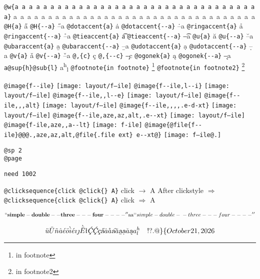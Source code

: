 \documentclass{book}
\renewcommand{\includegraphics}[1]{\fbox{FIG #1}}
\begin{document}
\begin{titlepage}
\texttt{@w\{a a a a a a a a a a a a a a a a a a a a a a a a a a a a a a a a a a a\}} \hbox{a a a a a a a a a a a a a a a a a a a a a a a a a a a a a a a a a a a}
\texttt{@H\{a\}} \H{a}
\texttt{@H\{{-}{-}a\}} \H{--a}
\texttt{@dotaccent\{a\}} \.{a}
\texttt{@dotaccent\{{-}{-}a\}} \.{--a}
\texttt{@ringaccent\{a\}} \r{a}
\texttt{@ringaccent\{{-}{-}a\}} \r{--a}
\texttt{@tieaccent\{a\}} \t{a}
\texttt{@tieaccent\{{-}{-}a\}} \t{--a}
\texttt{@u\{a\}} \u{a}
\texttt{@u\{{-}{-}a\}} \u{--a}
\texttt{@ubaraccent\{a\}} \b{a}
\texttt{@ubaraccent\{{-}{-}a\}} \b{--a}
\texttt{@udotaccent\{a\}} \d{a}
\texttt{@udotaccent\{{-}{-}a\}} \d{--a}
\texttt{@v\{a\}} \v{a}
\texttt{@v\{{-}{-}a\}} \v{--a}
\texttt{@,\{c\}} \c{c}
\texttt{@,\{{-}{-}c\}} \c{--c}
\texttt{@ogonek\{a\}} \k{a}
\texttt{@ogonek\{{-}{-}a\}} \k{--a}
\texttt{a@sup\{h\}@sub\{l\}} a\textsuperscript{h}\textsubscript{l}
\texttt{@footnote\{in footnote\}} \footnote{in footnote}
\texttt{@footnote\{in footnote2\}} \footnote{in footnote2}

\texttt{@image\{f{-}{-}ile\}} \texttt{[image: layout/f--ile]}
\texttt{@image\{f{-}{-}ile,l{-}{-}i\}} \texttt{[image: layout/f--ile]}
\texttt{@image\{f{-}{-}ile,,l{-}{-}e\}} \texttt{[image: layout/f--ile]}
\texttt{@image\{f{-}{-}ile,,,alt\}} \texttt{[image: layout/f--ile]}
\texttt{@image\{f{-}{-}ile,,,,.e-d-xt\}} \texttt{[image: layout/f--ile]}
\texttt{@image\{f{-}{-}ile,aze,az,alt,.e{-}{-}xt\}} \texttt{[image: layout/f--ile]}
\texttt{@image\{f-ile,aze,,a{-}{-}lt\}} \texttt{[image: f-ile]}
\texttt{@image\{@file\{f{-}{-}ile\}@@@.,aze,az,alt,@file\{.file ext\} e{-}{-}xt@\}} \texttt{[image: f--ile@.]}

\texttt{@sp 2}\leavevmode{}\\
\baselineskip %
\texttt{@page}\leavevmode{}\\
\newpage{}%

\texttt{need 1002}
\needspace{1.002pt}%

\texttt{@clicksequence\{click @click\{\} A\}} click $\rightarrow{}$ A
After clickstyle $\Rightarrow{}$
\texttt{@clicksequence\{click @click\{\} A\}} click $\Rightarrow{}$ A

$$
\mathbf{``simple-double--three---four----''} \hbox{aa}
`\hbox{}`simple-double-\hbox{}-three---four----'\hbox{}'
$$

$$
\ddot{u} \ddot{U} \tilde{n} \hat{a} \acute{e} \bar{o} \grave{i} \acute{e} \imath{} \jmath{} \grave{\bar{E}}
\mathord{\text{\l{}}} \textsl{\c{\'{C}}} \textsl{\c{\'{C}}} \textsl{\c{c}} \textsl{\H{a}} \dot{a} \mathring{a} \textsl{\t{a}}
\breve{a} \textsl{\b{a}} \textsl{\d{a}} \check{a} \textsl{\k{a}} a^{h}_{l}
 \ {}\ {} \ {}\-{}   ! ? . @ \} \{ 
\today{}
$$


\end{titlepage}
\end{document}
